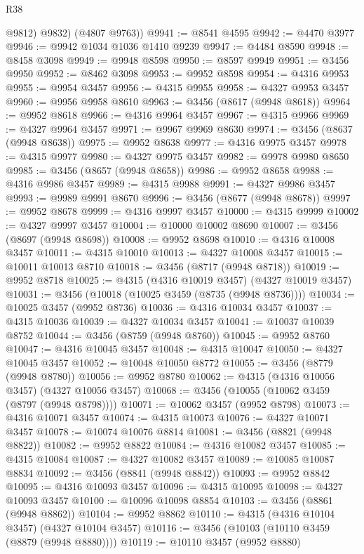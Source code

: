 \begin{lexlean}{R38}
\begin{coremodule}
          @9812)
        @9832)
      (@4807 @9763))
@9941 := @8541 @4595
@9942 := @4470 @3977
@9946 := @9942 @1034 @1036 @1410 @9239
@9947 := @4484 @8590
@9948 := @8458 @3098
@9949 := @9948 @8598
@9950 := @8597 @9949
@9951 := @3456 @9950
@9952 := @8462 @3098
@9953 := @9952 @8598
@9954 := @4316 @9953
@9955 := @9954 @3457
@9956 := @4315 @9955
@9958 := @4327 @9953 @3457
@9960 := @9956 @9958 @8610
@9963 := @3456 (@8617 (@9948 @8618))
@9964 := @9952 @8618
@9966 := @4316 @9964 @3457
@9967 := @4315 @9966
@9969 := @4327 @9964 @3457
@9971 := @9967 @9969 @8630
@9974 := @3456 (@8637 (@9948 @8638))
@9975 := @9952 @8638
@9977 := @4316 @9975 @3457
@9978 := @4315 @9977
@9980 := @4327 @9975 @3457
@9982 := @9978 @9980 @8650
@9985 := @3456 (@8657 (@9948 @8658))
@9986 := @9952 @8658
@9988 := @4316 @9986 @3457
@9989 := @4315 @9988
@9991 := @4327 @9986 @3457
@9993 := @9989 @9991 @8670
@9996 := @3456 (@8677 (@9948 @8678))
@9997 := @9952 @8678
@9999 := @4316 @9997 @3457
@10000 := @4315 @9999
@10002 := @4327 @9997 @3457
@10004 := @10000 @10002 @8690
@10007 := @3456 (@8697 (@9948 @8698))
@10008 := @9952 @8698
@10010 := @4316 @10008 @3457
@10011 := @4315 @10010
@10013 := @4327 @10008 @3457
@10015 := @10011 @10013 @8710
@10018 := @3456 (@8717 (@9948 @8718))
@10019 := @9952 @8718
@10025 := @4315 (@4316 @10019 @3457) (@4327 @10019 @3457)
@10031 := @3456 (@10018 (@10025 @3459 (@8735 (@9948 @8736))))
@10034 := @10025 @3457 (@9952 @8736)
@10036 := @4316 @10034 @3457
@10037 := @4315 @10036
@10039 := @4327 @10034 @3457
@10041 := @10037 @10039 @8752
@10044 := @3456 (@8759 (@9948 @8760))
@10045 := @9952 @8760
@10047 := @4316 @10045 @3457
@10048 := @4315 @10047
@10050 := @4327 @10045 @3457
@10052 := @10048 @10050 @8772
@10055 := @3456 (@8779 (@9948 @8780))
@10056 := @9952 @8780
@10062 := @4315 (@4316 @10056 @3457) (@4327 @10056 @3457)
@10068 := @3456 (@10055 (@10062 @3459 (@8797 (@9948 @8798))))
@10071 := @10062 @3457 (@9952 @8798)
@10073 := @4316 @10071 @3457
@10074 := @4315 @10073
@10076 := @4327 @10071 @3457
@10078 := @10074 @10076 @8814
@10081 := @3456 (@8821 (@9948 @8822))
@10082 := @9952 @8822
@10084 := @4316 @10082 @3457
@10085 := @4315 @10084
@10087 := @4327 @10082 @3457
@10089 := @10085 @10087 @8834
@10092 := @3456 (@8841 (@9948 @8842))
@10093 := @9952 @8842
@10095 := @4316 @10093 @3457
@10096 := @4315 @10095
@10098 := @4327 @10093 @3457
@10100 := @10096 @10098 @8854
@10103 := @3456 (@8861 (@9948 @8862))
@10104 := @9952 @8862
@10110 := @4315 (@4316 @10104 @3457) (@4327 @10104 @3457)
@10116 := @3456 (@10103 (@10110 @3459 (@8879 (@9948 @8880))))
@10119 := @10110 @3457 (@9952 @8880)

\end{coremodule}
\end{lexlean}
